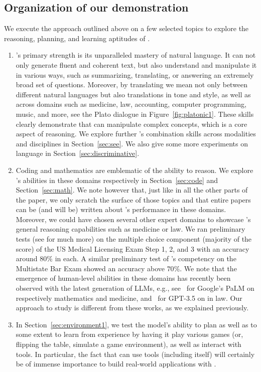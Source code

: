     \subsection{Organization of our demonstration} \label{sec:outline}
    We execute the approach outlined above on a few selected topics to explore the reasoning, planning, and learning aptitudes of {\DV}.
    \begin{enumerate}
    \item \DV's primary strength is its unparalleled mastery of natural language. It can not only generate fluent and coherent text, but also understand and manipulate it in various ways, such as summarizing, translating, or answering an extremely broad set of questions. Moreover, by translating we mean not only between different natural languages but also translations in tone and style, as well as across domains such as medicine, law, accounting, computer programming, music, and more, see the Plato dialogue in Figure~\ref{fig:platonic1}. These skills clearly demonstrate that {\DV} can manipulate complex concepts, which is a core aspect of reasoning. We explore further {\DV}'s combination skills across modalities and disciplines in Section~\ref{sec:see}. We also give some more experiments on language in Section~\ref{sec:discriminative}.
    \item Coding and mathematics are emblematic of the ability to reason. We explore {\DV}'s abilities in these domains respectively in Section~\ref{sec:code} and Section~\ref{sec:math}. We note however that, just like in all the other parts of the paper, we only scratch the surface of those topics and that entire papers can be (and will be) written about {\DV}'s performance in these domains. Moreover, we could have chosen several other expert domains to showcase {\DV}'s general reasoning capabilities such as medicine or law. We ran preliminary tests (see \cite{gpt4} for much more) on the multiple choice component (majority of the score) of the US Medical Licensing Exam Step 1, 2, and 3 with an accuracy around $80\%$ in each. A similar preliminary test of {\DV}'s competency on the Multistate Bar Exam showed an accuracy above $70\%$. We note that the emergence of human-level abilities in these domains has recently been observed with the latest generation of LLMs, e.g., see~\cite{lewkowycz2022solving, singhal2022large} for Google's PaLM on respectively mathematics and medicine, and~\cite{bommarito2022gpt} for GPT-3.5 on in law. Our approach to study {\DV} is different from these works, as we explained previously.
    \item In Section~\ref{sec:environment1}, we test the model's ability to plan as well as to some extent to learn from experience by having it play various games (or, flipping the table, simulate a game environment), as well as interact with tools. In particular, the fact that {\DV} can use tools (including itself) will certainly be of immense importance to build real-world applications with {\DV}.

\end{enumerate}
